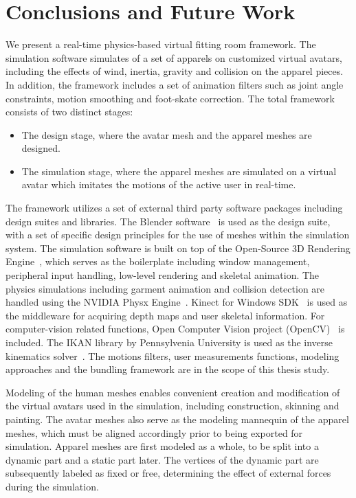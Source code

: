 \chapter{Conclusions and Future Work}
\label{chapter_conclusion}  

We present a real-time physics-based virtual fitting room framework. The simulation software simulates of a set of apparels on customized virtual avatars, including the effects of wind, inertia, gravity and collision on the apparel pieces. In addition, the framework includes a set of animation filters such as joint angle constraints, motion smoothing and foot-skate correction. The total framework consists of two distinct stages: 

\begin{itemize}
  \item The design stage, where the avatar mesh and the apparel meshes are designed. 
  \item The simulation stage, where the apparel meshes are simulated on a virtual avatar which imitates the motions of the active user in real-time.   
\end{itemize}

The framework utilizes a set of external third party software packages including design suites and libraries. The Blender software~\cite{Blender} is used as the design suite, with a set of specific design principles for the use of meshes within the simulation system. The simulation software is built on top of the Open-Source 3D Rendering Engine~\cite{Knot2012}, which serves as the boilerplate including window management, peripheral input handling, low-level rendering and skeletal animation. The physics simulations including garment animation and collision detection are handled using the NVIDIA Physx Engine~\cite{WikiPhysx2012}. Kinect for Windows SDK~\cite{Microsoft2013} is used as the middleware for acquiring depth maps and user skeletal information. For computer-vision related functions, Open Computer Vision project (OpenCV)~\cite{opencv_library} is included. The IKAN library by Pennsylvenia University is used as the inverse kinematics solver~\cite{IKAN2013}. The motions filters, user measurements functions, modeling approaches and the bundling framework are in the scope of this thesis study. 

Modeling of the human meshes enables convenient creation and modification of the virtual avatars used in the simulation, including construction, skinning and painting. The avatar meshes also serve as the modeling mannequin of the apparel meshes, which must be aligned accordingly prior to being exported for simulation. Apparel meshes are first modeled as a whole, to be split into a dynamic part and a static part later. The vertices of the dynamic part are subsequently labeled as fixed or free, determining the effect of external forces during the simulation.

